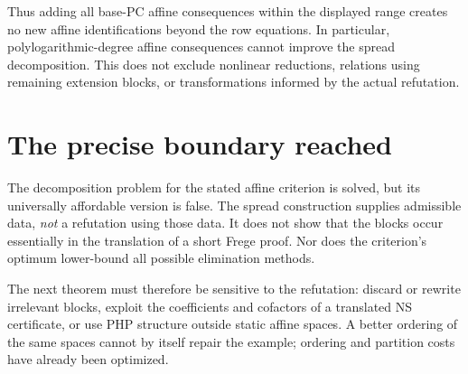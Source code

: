 \begin{remark}
Thus adding all base-PC affine consequences within the displayed range creates no new affine identifications beyond the row equations. In particular, polylogarithmic-degree affine consequences cannot improve the spread decomposition. This does not exclude nonlinear reductions, relations using remaining extension blocks, or transformations informed by the actual refutation.
\end{remark}

\section{The precise boundary reached}
The decomposition problem for the stated affine criterion is solved, but its universally affordable version is false. The spread construction supplies admissible data, \emph{not} a refutation using those data. It does not show that the blocks occur essentially in the translation of a short Frege proof. Nor does the criterion's optimum lower-bound all possible elimination methods.

The next theorem must therefore be sensitive to the refutation: discard or rewrite irrelevant blocks, exploit the coefficients and cofactors of a translated NS certificate, or use PHP structure outside static affine spaces. A better ordering of the same spaces cannot by itself repair the example; ordering and partition costs have already been optimized.
